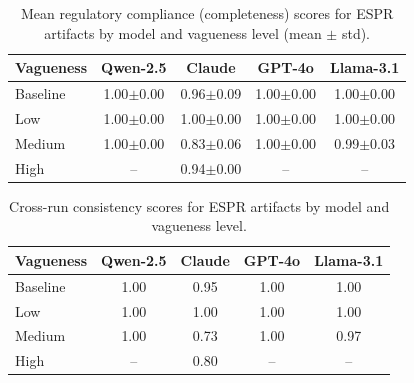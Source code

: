 \begin{table}[t]
  \centering
  \caption{Mean regulatory compliance (completeness) scores for ESPR artifacts by model and vagueness level (mean $\pm$ std).}
  \label{tab:espr_completeness}
  \begin{tabular}{lcccc}
    \toprule
    Vagueness & Qwen-2.5 & Claude & GPT-4o & Llama-3.1 \\
    \midrule
    Baseline & 1.00$\pm$0.00 & 0.96$\pm$0.09 & 1.00$\pm$0.00 & 1.00$\pm$0.00 \\
    Low & 1.00$\pm$0.00 & 1.00$\pm$0.00 & 1.00$\pm$0.00 & 1.00$\pm$0.00 \\
    Medium & 1.00$\pm$0.00 & 0.83$\pm$0.06 & 1.00$\pm$0.00 & 0.99$\pm$0.03 \\
    High & -- & 0.94$\pm$0.00 & -- & -- \\
    \bottomrule
  \end{tabular}
\end{table}

\begin{table}[t]
  \centering
  \caption{Cross-run consistency scores for ESPR artifacts by model and vagueness level.}
  \label{tab:espr_consistency}
  \begin{tabular}{lcccc}
    \toprule
    Vagueness & Qwen-2.5 & Claude & GPT-4o & Llama-3.1 \\
    \midrule
    Baseline & 1.00 & 0.95 & 1.00 & 1.00 \\
    Low & 1.00 & 1.00 & 1.00 & 1.00 \\
    Medium & 1.00 & 0.73 & 1.00 & 0.97 \\
    High & -- & 0.80 & -- & -- \\
    \bottomrule
  \end{tabular}
\end{table}

